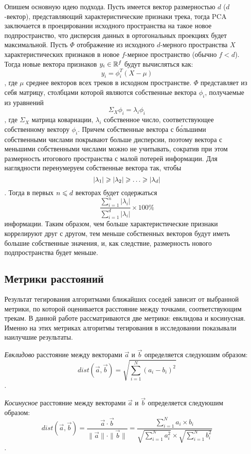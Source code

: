 Опишем основную идею подхода. Пусть имеется вектор размерностью $d$ ($d$-вектор), представляющий характеристические признаки трека, тогда PCA заключается в проецировании исходного пространства
на такое новое подпространство, что дисперсия данных в ортогональных проекциях будет максимальной. Пусть $\Phi$ \ld отображение из исходного $d$-мерного пространства $X$ характеристических
признаков в новое $f$-мерное пространство (обычно $f < d$). Тогда новые вектора признаков $y_i \in \mathbb{R}^f$ будут вычисляться как:
$$ y_i = \phi_i^T(X - \mu) $$,
где $\mu$ \ld среднее векторов всех треков в исходном пространстве. $\Phi$ представляет из себя матрицу, столбцами которой являются собственные вектора $\phi_i$, получаемые из уравнений
$$\Sigma_X \phi_i = \lambda_i\phi_i $$,
где $\Sigma_X$ \ld матрица ковариации, $\lambda_i$ \ld собственное число, соответствующее собственному вектору $\phi_i$. Причем собственные вектора с б\'{о}льшими собственными числами покрывают
больше дисперсии, поэтому вектора с меньшими собственными числами можно не учитывать, сократив при этом размерность итогового пространства с малой потерей информации. Для наглядности 
перенумеруем собственные вектора так, чтобы
$$|\lambda_1| \geqslant |\lambda_2| \geqslant \ldots \geqslant |\lambda_d|$$.
Тогда в первых $n \leqslant d$ векторах будет содержаться 
$$\frac{\sum_{i=1}^{n} |\lambda_i|}{\sum_{i=1}^{d} |\lambda_i|} \times 100\%$$ 
информации. Таким образом, чем больше характеристические признаки коррелируют друг с другом, тем меньше собственных векторов будут иметь большие собственные значения, и, как следствие, размерность нового подпространства
будет меньше.

\subsection{Метрики расстояний}

Результат тегирования алгоритмами ближайших соседей зависит от выбранной метрики, по которой оценивается расстояние между точками, соответствующим трекам.
В данной работе рассматриваются две метрики: евклидова и косинусная. Именно на этих метриках алгоритмы тегирования в исследовании \cite{msordo_thesis} показывали наилучшие результаты.

\emph{Евклидово} расстояние между векторами $\vec{a}$ и $\vec{b}$ определяется следуюшим образом:
$$ dist(\vec{a}, \vec{b}) = \sqrt{\sum_{i=1}^{N} (a_i - b_i)^2} $$.

\emph{Косинусное} расстояние между векторами $\vec{a}$ и $\vec{b}$ определяется следуюшим образом:
$$ dist(\vec{a}, \vec{b}) = \frac{\vec{a} \cdot \vec{b}}{\| \vec{a} \| \cdot \| \vec{b} \|} = \frac{\sum_{i=1}^{N} a_i \times b_i}{\sqrt{\sum_{i=1}^{N} a_i^2} \times \sqrt{\sum_{i=1}^{N} b_i^2}} $$.


